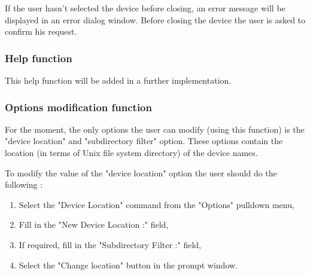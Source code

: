 If the user hasn't selected the device before closing, an error message will be 
displayed in an error dialog window\footnotemark[1]. Before closing the device 
the user is asked to confirm his request. 
 
\subsubsection{Help function}
This help function will be added in a further implementation.

\subsubsection{Options modification function}
For the moment, the only options the user can modify (using this function) is
the "device location" and "subdirectory filter" option. These options contain 
the location (in terms of Unix file system directory) of the device names.

To modify the value of the "device location" option the user should do the
following :
\begin{enumerate}
\item
Select the "Device Location" command from the "Options" pulldown menu,
\item
Fill in the "New Device Location :" field,
\item
If required, fill in the "Subdirectory Filter :" field,
\item
Select the "Change location" button in the prompt window.
\end{enumerate}

